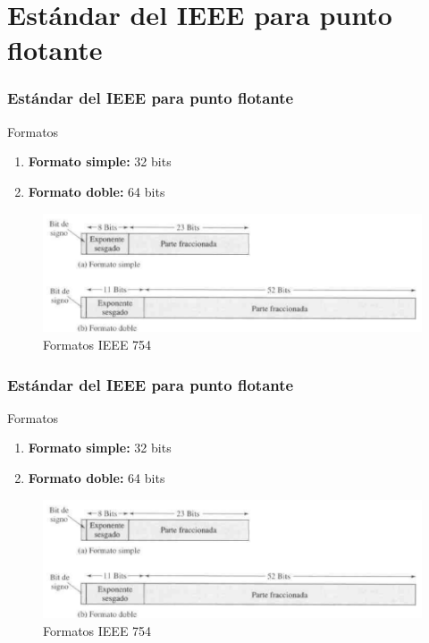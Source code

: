 \documentclass{beamer}
\begin{document}
\section{Estándar del IEEE para punto flotante}
\begin{frame}
	\frametitle{Estándar del IEEE para punto flotante}
	\begin{block}{Formatos}
		\begin{enumerate}
			\item \textbf{Formato simple:} 32 bits
			\item \textbf{Formato doble:} 64 bits
		\end{enumerate}
	\begin{figure}[H]
		\centering
		\includegraphics[scale=0.3]{imagenes/ieee754.png}
		\caption{Formatos IEEE 754}
	\end{figure}
	\end{block}
\end{frame}

\begin{frame}
	\frametitle{Estándar del IEEE para punto flotante}
	\begin{block}{Formatos}
		\begin{enumerate}
			\item \textbf{Formato simple:} 32 bits
			\item \textbf{Formato doble:} 64 bits
		\end{enumerate}
	\begin{figure}[H]
		\centering
		\includegraphics[scale=0.3]{imagenes/ieee754.png}
		\caption{Formatos IEEE 754}
	\end{figure}
	\end{block}
\end{frame}
\end{document}
